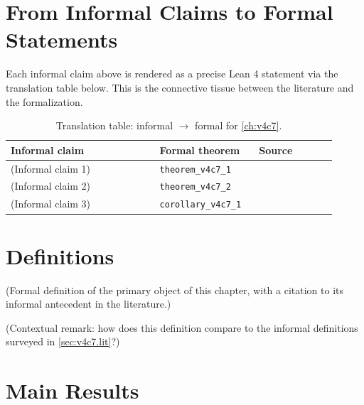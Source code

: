         \section{From Informal Claims to Formal Statements}
        \label{sec:v4c7.bridge}

        Each informal claim above is rendered as a precise Lean 4 statement
        via the translation table below.  This is the connective tissue
        between the literature and the formalization.

        \begin{table}[ht]
        \centering
        \begin{tabular}{p{0.42\linewidth} p{0.28\linewidth} p{0.22\linewidth}}
        \toprule
        \textbf{Informal claim} & \textbf{Formal theorem} & \textbf{Source} \\
        \midrule
        (Informal claim 1) & \texttt{theorem\_v4c7\_1} & \cite{lean4_tpil} \\
        (Informal claim 2) & \texttt{theorem\_v4c7\_2} & \cite{mathlib4} \\
        (Informal claim 3) & \texttt{corollary\_v4c7\_1} & \cite{mac_lane_1998} \\
        \bottomrule
        \end{tabular}
        \caption{Translation table: informal $\rightarrow$ formal for
        \cref{ch:v4c7}.}
        \label{tab:v4c7.bridge}
        \end{table}

        \section{Definitions}

        \begin{definition}
        \label{def:v4c7.1}
          (Formal definition of the primary object of this chapter, with
          a citation to its informal antecedent in the literature.)
        \end{definition}

        \begin{remark}
          (Contextual remark: how does this definition compare to the
          informal definitions surveyed in
          \cref{sec:v4c7.lit}?)
        \end{remark}

        \section{Main Results}

